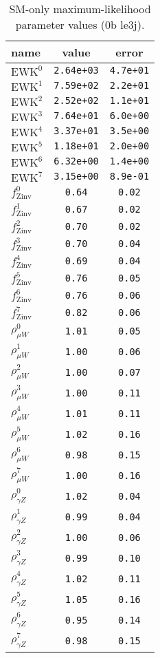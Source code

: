%

\begin{table}\centering
\caption{SM-only maximum-likelihood parameter values (0b le3j).}
\label{tab:mlParameterValues0b_le3j}
\begin{tabular}{lcc}name & value & error \\ \hline
$\mathrm{EWK}^{0}$ & {\tt  2.64e+03} & {\tt  4.7e+01}\\
$\mathrm{EWK}^{1}$ & {\tt  7.59e+02} & {\tt  2.2e+01}\\
$\mathrm{EWK}^{2}$ & {\tt  2.52e+02} & {\tt  1.1e+01}\\
$\mathrm{EWK}^{3}$ & {\tt  7.64e+01} & {\tt  6.0e+00}\\
$\mathrm{EWK}^{4}$ & {\tt  3.37e+01} & {\tt  3.5e+00}\\
$\mathrm{EWK}^{5}$ & {\tt  1.18e+01} & {\tt  2.0e+00}\\
$\mathrm{EWK}^{6}$ & {\tt  6.32e+00} & {\tt  1.4e+00}\\
$\mathrm{EWK}^{7}$ & {\tt  3.15e+00} & {\tt  8.9e-01}\\
$f_\mathrm{Zinv}^{0}$ & {\tt 0.64} & {\tt 0.02}\\
$f_\mathrm{Zinv}^{1}$ & {\tt 0.67} & {\tt 0.02}\\
$f_\mathrm{Zinv}^{2}$ & {\tt 0.70} & {\tt 0.02}\\
$f_\mathrm{Zinv}^{3}$ & {\tt 0.70} & {\tt 0.04}\\
$f_\mathrm{Zinv}^{4}$ & {\tt 0.69} & {\tt 0.04}\\
$f_\mathrm{Zinv}^{5}$ & {\tt 0.76} & {\tt 0.05}\\
$f_\mathrm{Zinv}^{6}$ & {\tt 0.76} & {\tt 0.06}\\
$f_\mathrm{Zinv}^{7}$ & {\tt 0.82} & {\tt 0.06}\\
$\rho_{\mu W}^{0}$ & {\tt 1.01} & {\tt 0.05}\\
$\rho_{\mu W}^{1}$ & {\tt 1.00} & {\tt 0.06}\\
$\rho_{\mu W}^{2}$ & {\tt 1.00} & {\tt 0.07}\\
$\rho_{\mu W}^{3}$ & {\tt 1.00} & {\tt 0.11}\\
$\rho_{\mu W}^{4}$ & {\tt 1.01} & {\tt 0.11}\\
$\rho_{\mu W}^{5}$ & {\tt 1.02} & {\tt 0.16}\\
$\rho_{\mu W}^{6}$ & {\tt 0.98} & {\tt 0.15}\\
$\rho_{\mu W}^{7}$ & {\tt 1.00} & {\tt 0.16}\\
$\rho_{\gamma Z}^{0}$ & {\tt 1.02} & {\tt 0.04}\\
$\rho_{\gamma Z}^{1}$ & {\tt 0.99} & {\tt 0.04}\\
$\rho_{\gamma Z}^{2}$ & {\tt 1.00} & {\tt 0.06}\\
$\rho_{\gamma Z}^{3}$ & {\tt 0.99} & {\tt 0.10}\\
$\rho_{\gamma Z}^{4}$ & {\tt 1.02} & {\tt 0.11}\\
$\rho_{\gamma Z}^{5}$ & {\tt 1.05} & {\tt 0.16}\\
$\rho_{\gamma Z}^{6}$ & {\tt 0.95} & {\tt 0.14}\\
$\rho_{\gamma Z}^{7}$ & {\tt 0.98} & {\tt 0.15}\\
\hline
\end{tabular}
\end{table}
%
